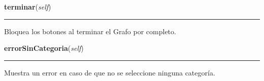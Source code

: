     \label{grafico:Grafico:terminar}

    \vspace{0.5ex}

\hspace{.8\funcindent}\begin{boxedminipage}{\funcwidth}

    \raggedright \textbf{terminar}(\textit{self})

    \vspace{-1.5ex}

    \rule{\textwidth}{0.5\fboxrule}
\setlength{\parskip}{2ex}
    Bloquea los botones al terminar el Grafo por completo.

\setlength{\parskip}{1ex}
    \end{boxedminipage}

    \label{grafico:Grafico:errorSinCategoria}

    \vspace{0.5ex}

\hspace{.8\funcindent}\begin{boxedminipage}{\funcwidth}

    \raggedright \textbf{errorSinCategoria}(\textit{self})

    \vspace{-1.5ex}

    \rule{\textwidth}{0.5\fboxrule}
\setlength{\parskip}{2ex}
    Muestra un error en caso de que no se seleccione ninguna categoría.

\setlength{\parskip}{1ex}
    \end{boxedminipage}

    \label{grafico:Grafico:dibujar}

    \vspace{0.5ex}


